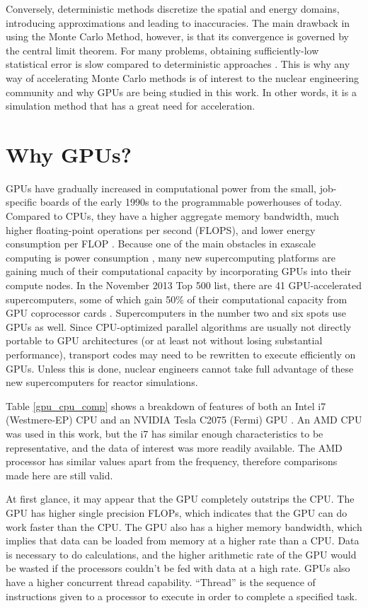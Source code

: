 Conversely, deterministic methods discretize the spatial and energy domains, introducing approximations and leading to inaccuracies.  The main drawback in using the Monte Carlo Method, however, is that its convergence is governed by the central limit theorem. For many problems, obtaining sufficiently-low statistical error is slow compared to deterministic approaches \cite{jaakko,openmc}.  This is why any way of accelerating Monte Carlo methods is of interest to the nuclear engineering community and why GPUs are being studied in this work.  In other words, it is a simulation method that has a great need for acceleration. 

\section{Why GPUs?}

GPUs have gradually increased in computational power from the small, job-specific boards of the early 1990s to the programmable powerhouses of today.  Compared to CPUs, they have a higher aggregate memory bandwidth, much higher floating-point operations per second (FLOPS), and lower energy consumption per FLOP \cite{cuda}.  Because one of the main obstacles in exascale computing is power consumption \cite{exascale}, many new supercomputing platforms are gaining much of their computational capacity by incorporating GPUs into their compute nodes.  In the November 2013 Top 500 list, there are 41 GPU-accelerated supercomputers, some of which gain 50\% of their computational capacity from GPU coprocessor cards \cite{top500}.  Supercomputers in the number two and six spots use GPUs as well.  Since CPU-optimized parallel algorithms are usually not directly portable to GPU architectures (or at least not without losing substantial performance), transport codes may need to be rewritten to execute efficiently on GPUs.  Unless this is done, nuclear engineers cannot take full advantage of these new supercomputers for reactor simulations.

Table \ref{gpu_cpu_comp} shows a breakdown of features of both an Intel i7 (Westmere-EP) CPU and an NVIDIA Tesla C2075 (Fermi) GPU \cite{cent, cpu_latency}.  An AMD CPU was used in this work, but the i7 has similar enough characteristics to be representative, and the data of interest was more readily available.  The AMD processor has similar values apart from the frequency, therefore comparisons made here are still valid.  

At first glance, it may appear that the GPU completely outstrips the CPU.  The GPU has higher single precision FLOPs, which indicates that the GPU can do work faster than the CPU.  The GPU also has a higher memory bandwidth, which implies that data can be loaded from memory at a higher rate than a CPU.  Data is necessary to do calculations, and the higher arithmetic rate of the GPU would be wasted if the processors couldn't be fed with data at a high rate.  GPUs also have a higher concurrent thread capability.  ``Thread'' is the sequence of instructions given to a processor to execute in order to complete a specified task.  

